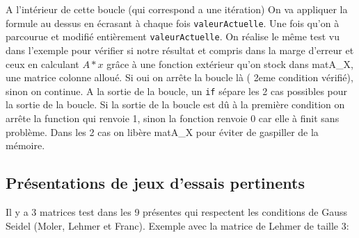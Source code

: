 \documentclass[12pt]{article}
\begin{document}
\begin{multicols}{2}
A l'intérieur de cette boucle (qui correspond a une itération) On va appliquer la formule au dessus en écrasant à chaque fois \texttt{valeurActuelle}. Une fois qu'on à parcourue et modifié entièrement \texttt{valeurActuelle}. On réalise le même test vu dans l'exemple pour vérifier si notre résultat et compris dans la marge d'erreur et ceux en calculant $A*x$ grâce à une fonction extérieur qu'on stock dans matA\_X, une matrice colonne alloué. Si oui on arrête la boucle là ( 2eme condition vérifié), sinon on continue.
A la sortie de la boucle, un \texttt{if} sépare les 2 cas possibles pour la sortie de la boucle. Si la sortie de la boucle est dû à la première condition on arrête la function qui renvoie 1, sinon la fonction renvoie 0 car elle à finit sans problème. Dans les 2 cas on libère matA\_X pour éviter de gaspiller de la mémoire.
\end{multicols}

\subsection{Présentations de jeux d'essais pertinents}

Il y a 3 matrices test dans les 9 présentes qui respectent les conditions de Gauss Seidel (Moler, Lehmer et Franc). 
Exemple avec la matrice de Lehmer de taille 3:

\newpage
\end{document}
